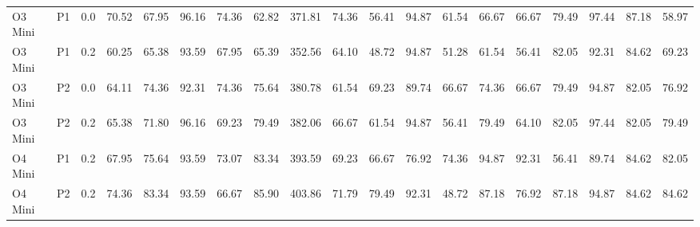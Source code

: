 \begin{landscape}
\begin{longtable}{|l|c|c|ccccc|c|ccccc|ccccc|}
        O3 Mini & P1 & 0.0 & 70.52 & 67.95 & 96.16 & 74.36 & 62.82 & 371.81 & 74.36 & 56.41 & 94.87 & 61.54 & 66.67 & 66.67 & 79.49 & 97.44 & 87.18 & 58.97 \\
        O3 Mini & P1 & 0.2 & 60.25 & 65.38 & 93.59 & 67.95 & 65.39 & 352.56 & 64.10 & 48.72 & 94.87 & 51.28 & 61.54 & 56.41 & 82.05 & 92.31 & 84.62 & 69.23 \\
        O3 Mini & P2 & 0.0 & 64.11 & 74.36 & 92.31 & 74.36 & 75.64 & 380.78 & 61.54 & 69.23 & 89.74 & 66.67 & 74.36 & 66.67 & 79.49 & 94.87 & 82.05 & 76.92 \\
        O3 Mini & P2 & 0.2 & 65.38 & 71.80 & 96.16 & 69.23 & 79.49 & 382.06 & 66.67 & 61.54 & 94.87 & 56.41 & 79.49 & 64.10 & 82.05 & 97.44 & 82.05 & 79.49 \\
        O4 Mini & P1 & 0.2 & 67.95 & 75.64 & 93.59 & 73.07 & 83.34 & 393.59 & 69.23 & 66.67 & 76.92 & 74.36 & 94.87 & 92.31 & 56.41 & 89.74 & 84.62 & 82.05 \\
        O4 Mini & P2 & 0.2 & 74.36 & 83.34 & 93.59 & 66.67 & 85.90 & 403.86 & 71.79 & 79.49 & 92.31 & 48.72 & 87.18 & 76.92 & 87.18 & 94.87 & 84.62 & 84.62 \\
    \end{longtable}
\end{landscape}